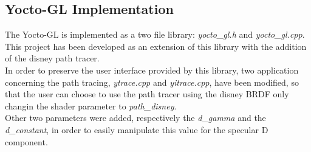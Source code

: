\documentclass[11pt]{article}
\begin{document}
\subsection{Yocto-GL Implementation}
The Yocto-GL is implemented as a two file library: \textit{yocto\_gl.h} and \textit{yocto\_gl.cpp}.
This project has been developed as an extension of this library with the addition of the disney path tracer.\\
In order to preserve the user interface provided by this library, two application concerning the path tracing, \textit{ytrace.cpp} and \textit{yitrace.cpp}, have been modified, so that the user can choose to use the path tracer using the disney BRDF only changin the shader parameter to \textit{path\_disney}.\\
Other two parameters were added, respectively the \textit{d\_gamma} and the \textit{d\_constant}, in order to easily manipulate this value for the specular D component.
\end{document}
